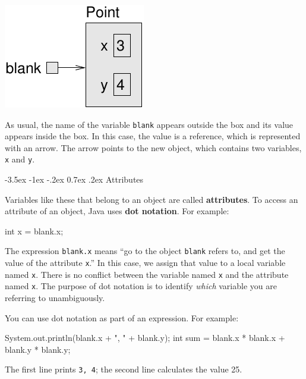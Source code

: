 \documentclass[12pt]{book}
\makeatletter
\theoremstyle{exercise}
\newcommand{\java}[1]{\verb"#1"}
\renewcommand{\section}{\@startsection{section}{1}{\z@}%
    {-3.5ex \@plus -1ex \@minus -.2ex}%
    {0.7ex \@plus.2ex}%
    {\normalfont\Large\bfseries}}
\newcommand{\java}[1]{\lstinline{#1}} %
\makeatother
\begin{document}

\begin{center}
\includegraphics{figs/reference.pdf}
\end{center}


As usual, the name of the variable \java{blank} appears outside the box and its value appears inside the box.
In this case, the value is a reference, which is represented with an arrow.
The arrow points to the new object, which contains two variables, \java{x} and \java{y}.

\section{Attributes}
\label{attribute}

Variables like these that belong to an object are called {\bf attributes}.
To access an attribute of an object, Java uses {\bf dot notation}.
For example:

\begin{code}
    int x = blank.x;
\end{code}

The expression \java{blank.x} means ``go to the object \java{blank} refers to, and get the value of the attribute \java{x}.''
In this case, we assign that value to a local variable named \java{x}.
There is no conflict between the variable named \java{x} and the attribute named \java{x}.
The purpose of dot notation is to identify {\em which} variable you are referring to unambiguously.

You can use dot notation as part of an expression.
For example:

\begin{code}
    System.out.println(blank.x + ", " + blank.y);
    int sum = blank.x * blank.x + blank.y * blank.y;
\end{code}

The first line prints {\tt 3, 4}; the second line calculates the value 25.
\end{document}
